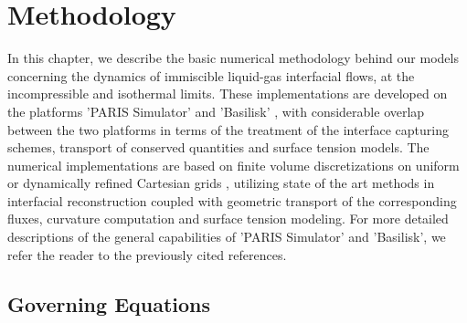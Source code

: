 \setchapterpreamble[u]{\margintoc}
\chapter{Methodology}

In this chapter, we describe the basic numerical methodology behind our models 
concerning the dynamics of immiscible liquid-gas interfacial flows, at the incompressible and isothermal limits. 
These implementations are developed on the platforms 'PARIS Simulator' \cite{paris} and 
'Basilisk' \cite{popinetbasilisk}, with considerable overlap between the two platforms in terms 
of the treatment of the interface capturing schemes, transport of conserved quantities and surface tension models.
The numerical implementations are based on finite volume discretizations on uniform or dynamically refined Cartesian grids , utilizing
state of the art methods in interfacial reconstruction coupled with geometric
transport of the corresponding fluxes, curvature computation and surface tension modeling. For more detailed
descriptions of the general capabilities of 'PARIS Simulator’ and 'Basilisk', we refer the reader to the previously cited references. 


\section{Governing Equations}

